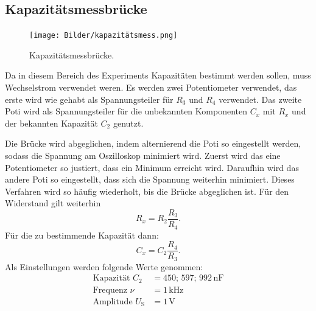\subsection{Kapazitätsmessbrücke}
\begin{figure}[H]
    \centering
        \centering
        \texttt{[image: Bilder/kapazitätsmess.png]}
        \caption{Kapazitätsmessbrücke. \cite{anleitung}}
    \hfill
    \label{fig:f3}
\end{figure}
\noindent Da in diesem Bereich des Experiments Kapazitäten bestimmt werden sollen, 
muss Wechselstrom verwendet weren. Es werden zwei Potentiometer verwendet, 
das erste wird wie gehabt als Spannungsteiler für $R_3$ und $R_4$ verwendet. Das 
zweite Poti wird als Spannungsteiler für die unbekannten Komponenten $C_x$ mit 
$R_x$ und der bekannten Kapazität $C_2$ genutzt.
\par\vspace{0.5em}
Die Brücke wird abgeglichen, indem alternierend die Poti so eingestellt werden, 
sodass die Spannung am Oszilloskop minimiert wird. Zuerst wird das eine Potentiometer 
so justiert, dass ein Minimum erreicht wird. Daraufhin wird das andere Poti so 
eingestellt, dass sich die Spannung weiterhin minimiert.
Dieses Verfahren wird so häufig wiederholt, bis die Brücke abgeglichen ist.
Für den Widerstand gilt weiterhin
\begin{equation}
    R_x = R_2 \frac{R_3}{R_4}.
\end{equation}
Für die zu bestimmende Kapazität dann:
\begin{equation}
    \label{eqn:2}
    C_x = C_2 \frac{R_4}{R_3}.
\end{equation}
\noindent Als Einstellungen werden folgende Werte genommen:
\begin{align*}
    \label{eqn:werte1}
    \text{Kapazität } C_2 &= 450;\, 597;\, 992\,\unit{\nano\farad} \\
    \text{Frequenz } \nu &= 1\,\unit{\kilo\hertz} \\
    \text{Amplitude } U_{\text{S}} &= 1\,\unit{\volt} \\
\end{align*}

